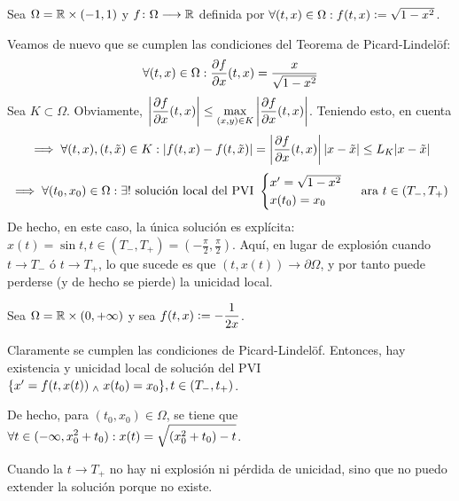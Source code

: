 \begin{ejem}
	Sea $\Omega = \mathbb{R} \times (-1,1)$ y $f \colon \Omega \longrightarrow \mathbb{R}$ definida por $\forall (t,x) \in \Omega : f(t,x)\vcentcolon= \sqrt{1-x^2} $.

	Veamos de nuevo que se cumplen las condiciones del Teorema de Picard-Lindelöf: \[\forall (t,x) \in \Omega : \pdv{f}{x}(t,x)=\frac{x}{\sqrt{1-x^2}}\]
	Sea $K \subset \Omega$. Obviamente, $\displaystyle \left |\frac{\partial f }{\partial x}(t,x) \right | \leq \displaystyle \max_{(x,y)\in K} \left |\frac{\partial f }{\partial x}(t,x) \right |$.
	Teniendo esto, en cuenta
	\[\implies \forall (t,x) , (t,\Tilde{x}) \in K : |f(t,x)-f(t,\Tilde{x})| = \left |\frac{\partial f }{\partial x}(t,x) \right | |x-\Tilde{x}| \leq L_K |x-\Tilde{x}| \]
	\[\implies \forall (t_0,x_0)\in \Omega : \exists ! \text{ solución local del PVI } \begin{cases}x'=\sqrt{1-x^2} \\ x(t_0)=x_0 \end{cases}\text{ ara } t \in (T_-,T_+)\]
	De hecho, en este caso, la única solución es explícita: $x(t)=\sin t, t \in (T_-,T_+)=\left ( - \frac{\pi}{2}, \frac{\pi}{2} \right )$.
	Aquí, en lugar de explosión cuando $t \to T_-$ ó $t \to T_+$, lo que sucede es que $(t,x(t)) \to \partial \Omega$, y por tanto puede perderse (y de hecho se pierde) la unicidad local.
\end{ejem}

\begin{ejem}
	Sea $\Omega = \mathbb{R} \times (0, + \infty)$ y sea $\displaystyle f(t,x) \vcentcolon= - \frac{1}{2x}$.

	Claramente se cumplen las condiciones de Picard-Lindelöf. Entonces, hay existencia y unicidad local de solución del PVI $\{ x'=f(t,x(t)) \; _{\wedge} \; x(t_0)=x_0 \}, t \in (T_-,t_+)$.

	De hecho, para $(t_0,x_0)\in \Omega$, se tiene que $\displaystyle \forall t \in (-\infty , x_0^2 + t_0) : x(t)=\sqrt{(x_0^2+t_0)-t}$.

	Cuando la $t \to T_+$ no hay ni explosión ni pérdida de unicidad, sino que no puedo extender la solución porque no existe.
\end{ejem}


